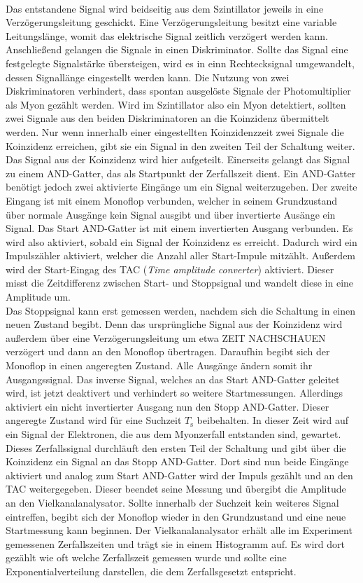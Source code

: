\\
Das entstandene Signal wird beidseitig aus dem Szintillator jeweils in eine Verzögerungsleitung geschickt.
Eine Verzögerungsleitung besitzt eine variable Leitungslänge, womit das elektrische Signal zeitlich verzögert werden kann.
Anschließend gelangen die Signale in einen Diskriminator.
Sollte das Signal eine festgelegte Signalstärke übersteigen, wird es in einn Rechtecksignal umgewandelt, dessen Signallänge eingestellt werden kann.
Die Nutzung von zwei Diskriminatoren verhindert, dass spontan ausgelöste Signale der Photomultiplier als Myon gezählt werden.
Wird im Szintillator also ein Myon detektiert, sollten zwei Signale aus den beiden Diskriminatoren an die Koinzidenz übermittelt werden.
Nur wenn innerhalb einer eingestellten Koinzidenzzeit zwei Signale die Koinzidenz erreichen, gibt sie ein Signal in den zweiten Teil der Schaltung weiter.
\\
Das Signal aus der Koinzidenz wird hier aufgeteilt.
Einerseits gelangt das Signal zu einem AND-Gatter, das als Startpunkt der Zerfallszeit dient.
Ein AND-Gatter benötigt jedoch zwei aktivierte Eingänge um ein Signal weiterzugeben.
Der zweite Eingang ist mit einem Monoflop verbunden, welcher in seinem Grundzustand über normale Ausgänge kein Signal ausgibt und über invertierte Ausänge ein Signal.
Das Start AND-Gatter ist mit einem invertierten Ausgang verbunden.
Es wird also aktiviert, sobald ein Signal der Koinzidenz es erreicht.
Dadurch wird ein Impulszähler aktiviert, welcher die Anzahl aller Start-Impule mitzählt.
Außerdem wird der Start-Eingag des TAC (\textit{Time amplitude converter}) aktiviert.
Dieser misst die Zeitdifferenz zwischen Start- und Stoppsignal und wandelt diese in eine Amplitude um.
\\
Das Stoppsignal kann erst gemessen werden, nachdem sich die Schaltung in einen neuen Zustand begibt.
Denn das ursprüngliche Signal aus der Koinzidenz wird außerdem über eine Verzögerungsleitung um etwa ZEIT NACHSCHAUEN verzögert und dann an den Monoflop übertragen.
Daraufhin begibt sich der Monoflop in einen angeregten Zustand. 
Alle Ausgänge ändern somit ihr Ausgangssignal.
Das inverse Signal, welches an das Start AND-Gatter geleitet wird, ist jetzt deaktivert und verhindert so weitere Startmessungen.
Allerdings aktiviert ein nicht invertierter Ausgang nun den Stopp AND-Gatter.
Dieser angeregte Zustand wird für eine Suchzeit $T_\text{s}$ beibehalten. 
In dieser Zeit wird auf ein Signal der Elektronen, die aus dem Myonzerfall entstanden sind, gewartet.
Dieses Zerfallssignal durchläuft den ersten Teil der Schaltung und gibt über die Koinzidenz ein Signal an das Stopp AND-Gatter.
Dort sind nun beide Eingänge aktiviert und analog zum Start AND-Gatter wird der Impuls gezählt und an den TAC weitergegeben.
Dieser beendet seine Messung und übergibt die Amplitude an den Vielkanalanalysator.
Sollte innerhalb der Suchzeit kein weiteres Signal eintreffen, begibt sich der Monoflop wieder in den Grundzustand und eine neue Startmessung kann beginnen.
Der Vielkanalanalysator erhält alle im Experiment gemessenen Zerfallszeiten und trägt sie in einem Histogramm auf.
Es wird dort gezählt wie oft welche Zerfallszeit gemessen wurde und sollte eine Exponentialverteilung darstellen, die dem Zerfallsgesetzt entspricht.